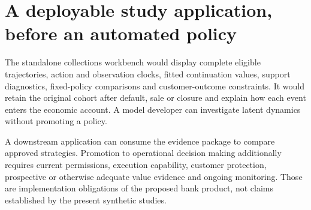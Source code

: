 \section{A deployable study application, before an automated policy}
The standalone collections workbench would display complete eligible
trajectories, action and observation clocks, fitted continuation values,
support diagnostics, fixed-policy comparisons and customer-outcome
constraints. It would retain the original cohort after default, sale or
closure and explain how each event enters the economic account. A model
developer can investigate latent dynamics without promoting a policy.

A downstream application can consume the evidence package to compare
approved strategies. Promotion to operational decision making additionally
requires current permissions, execution capability, customer protection,
prospective or otherwise adequate value evidence and ongoing monitoring.
Those are implementation obligations of the proposed bank product, not
claims established by the present synthetic studies.
